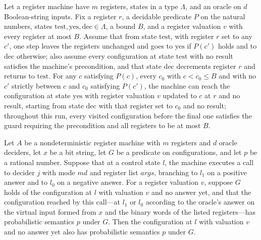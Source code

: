 \begin{theorem}
\label{Complexity.LogProg.searchDown_run}
\leanok
{}
Let a register machine have $m$ registers, states in a type $\Lambda$, and an oracle on
$d$ Boolean-string inputs. Fix a register $r$, a decidable predicate $P$ on the natural
numbers, states $\mathrm{test},\mathrm{yes},\mathrm{dec}\in\Lambda$, a bound $B$, and a
register valuation $v$ with every register at most $B$. Assume that from state
$\mathrm{test}$, with register $r$ set to any $c'$, one step leaves the registers
unchanged and goes to $\mathrm{yes}$ if $P(c')$ holds and to $\mathrm{dec}$ otherwise;
also assume every configuration at state $\mathrm{test}$ with no result satisfies the
machine's precondition, and that state $\mathrm{dec}$ decrements register $r$ and
returns to $\mathrm{test}$. For any $c$ satisfying $P(c)$, every $c_0$ with $c<c_0\le B$
and with no $c'$ strictly between $c$ and $c_0$ satisfying $P(c')$, the machine can
reach the configuration at state $\mathrm{yes}$ with register valuation $v$ updated to
$c$ at $r$ and no result, starting from state $\mathrm{dec}$ with that register set to
$c_0$ and no result; throughout this run, every visited configuration before the final
one satisfies the guard requiring the precondition and all registers to be at most $B$.
\end{theorem}

\begin{lemma}
\label{Complexity.LogProg.PSem.call}
\leanok
{}
Let $A$ be a nondeterministic register machine with $m$ registers and $d$ oracle
deciders, let $x$ be a bit string, let $G$ be a predicate on configurations, and let $p$
be a rational number. Suppose that at a control state $l$, the machine executes a call
to decider $j$ with mode $md$ and register list $args$, branching to $l_1$ on a positive
answer and to $l_0$ on a negative answer. For a register valuation $v$, suppose $G$
holds of the configuration at $l$ with valuation $v$ and no answer yet, and that the
configuration reached by this call—at $l_1$ or $l_0$ according to the oracle's answer on
the virtual input formed from $x$ and the binary words of the listed registers—has
probabilistic semantics $p$ under $G$. Then the configuration at $l$ with valuation $v$
and no answer yet also has probabilistic semantics $p$ under $G$.
\end{lemma}

